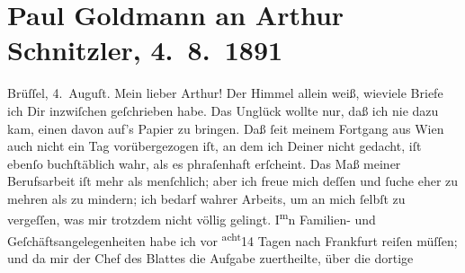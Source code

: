               \section[Paul Goldmann an Arthur Schnitzler, 4. 8. 1891]{ Paul Goldmann an Arthur Schnitzler, 4. 8. 1891}\nopagebreak{}\rehead{ }\begin{ledgroupsized}[t]{13cm}\normalsize\beginnumbering \toendnotes[C]{\smallbreak\pagebreak[2]} 
\toendnotes[C]{\smallbreak}\pstart
           \centering{}{\pb}Brüſſel, 4. Auguſt.\pend
           \pstart\center{}Mein lieber Arthur!\pend\pstart
           Der Himmel allein weiß, wieviele Briefe ich Dir inzwiſchen geſchrieben habe. Das
               Unglück wollte nur, daß ich nie dazu kam, einen davon auf’s Papier zu bringen. Daß
                   ſeit meinem Fortgang aus Wien auch nicht ein Tag vorübergezogen iſt, an dem ich Deiner
               nicht gedacht, iſt ebenſo buchſtäblich wahr, als es phraſenhaft erſcheint. Das Maß
               meiner Berufsarbeit iſt mehr als menſchlich; aber ich \strikeout{\textcolor{gray}{×}} freue mich deſſen und ſuche eher zu mehren als zu mindern; ich bedarf wahrer
                  Arbeits\label{K_L02668-10v}\label{K_L02668-10h}, um
               an mich ſelbſt zu vergeſſen, was mir trotzdem nicht völlig gelingt. I\substVorne{}\textsuperscript{m}\substDazwischen{}n\substHinten{} Familien- und Geſchäftsangelegenheiten habe ich vor \substVorne{}\textsuperscript{acht}\substDazwischen{}14\substHinten{} Tagen nach Frankfurt reiſen müſſen; und
               da mir der Chef des Blattes die Aufgabe zuertheilte,
               über die dortige \label{K_L02668-1v}
\end{ledgroupsized}
